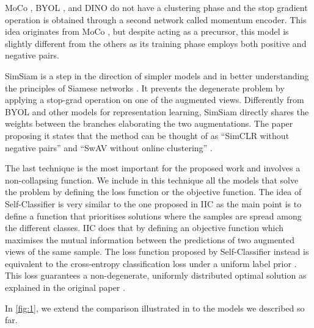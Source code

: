 \documentclass{article}
\begin{document}
MoCo \cite{moco}, BYOL \cite{byol}, and DINO \cite{dino} do not have a clustering phase and the stop gradient operation is obtained through a second network called momentum encoder. This idea originates from MoCo \cite{moco}, but despite acting as a precursor, this model is slightly different from the others as its training phase employs both positive and negative pairs. 

SimSiam \cite{simsiam} is a step in the direction of simpler models and in better understanding the principles of Siamese networks \cite{simsiam}. It prevents the degenerate problem by applying a stop-grad operation on one of the augmented views. Differently from BYOL \cite{byol} and other models for representation learning, SimSiam directly shares the weights between the branches elaborating the two augmentations. The paper proposing it states that the method can be thought of as “SimCLR without negative pairs” and “SwAV without online clustering” \cite{simsiam}.

The last technique is the most important for the proposed work and involves a non-collapsing function. We include in this technique all the models that solve the problem by defining the loss function or the objective function. The idea of Self-Classifier \cite{self_classifier} is very similar to the one proposed in IIC \cite{iic} as the main point is to define a function that prioritises solutions where the samples are spread among the different classes. IIC does that by defining an objective function which maximises the mutual information between the predictions of two augmented views of the same sample. The loss function proposed by Self-Classifier instead is equivalent to the cross-entropy classification loss under a uniform label prior \cite{self_classifier}. This loss guarantees a non-degenerate, uniformly distributed optimal solution as explained in the original paper \cite{self_classifier}.


In \autoref{fig:1}, we extend the comparison illustrated in \cite{simsiam} to the models we described so far.
\end{document}
